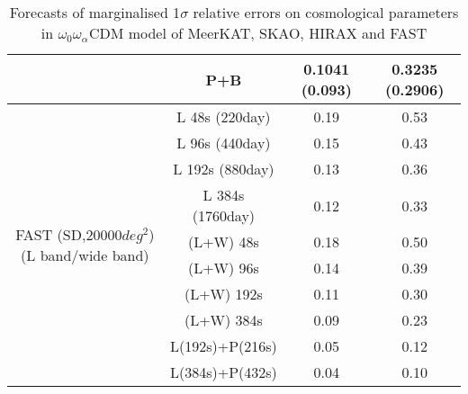 \documentclass{article}
\begin{document}
\begin{table}[H]
\begin{tabular}{c|c|cc}
                               & P+B                   & 0.1041 (0.093)                          & 0.3235 (0.2906)                              \\ \hline
    \multirow{10}{*}{FAST (SD,20000$deg^2$)(L band/wide band)}     & L 48s (220day)                & 0.19                                    & 0.53                                         \\
                               & L 96s (440day)                & 0.15                                    & 0.43                                         \\
                               & L 192s (880day)               & 0.13                                    & 0.36                                         \\
                               & L 384s (1760day)               & 0.12                                    & 0.33                                         \\
                               & (L+W) 48s            & 0.18                                    & 0.50                                         \\
                               & (L+W) 96s            & 0.14                                    & 0.39                                         \\
                               & (L+W) 192s           & 0.11                                    & 0.30                                         \\
                               & (L+W) 384s           & 0.09                                    & 0.23                                         \\
                               & L(192s)+P(216s)      & 0.05                                    & 0.12                                         \\
                               & L(384s)+P(432s)      & 0.04                                    & 0.10                                         \\ \hline
    \end{tabular}
    \caption{Forecasts of marginalised 1$\sigma$ relative errors on cosmological parameters in $\omega_0\omega_\alpha$CDM model of MeerKAT, SKAO, HIRAX and FAST}
    \end{table}



\end{document}
